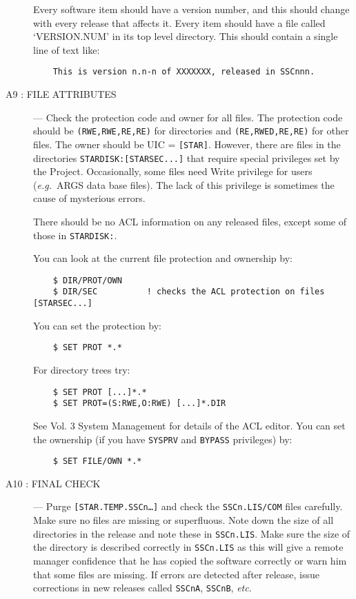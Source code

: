 \begin{description}
Every software item should have a version number, and this should change with
every release that affects it.
Every item should have a file called `VERSION.NUM' in its top level directory.
This should contain a single line of text like:
\begin{verbatim}
    This is version n.n-n of XXXXXXX, released in SSCnnn.
\end{verbatim}

\item [A9 : FILE ATTRIBUTES] ---
Check the protection code and owner for all files.
The protection code should be {\tt (RWE,RWE,RE,RE)} for directories and
{\tt (RE,RWED,RE,RE)} for other files.
The owner should be UIC = {\tt [STAR]}.
However, there are files in the directories {\tt STARDISK:[STARSEC...]} that
require special privileges set by the Project.
Occasionally, some files need Write privilege for users ({\em e.g.}\ ARGS
data base files).
The lack of this privilege is sometimes the cause of mysterious errors.

There should be no ACL information on any released files, except some of those
in {\tt STARDISK:\-[STARSEC...]}.

You can look at the current file protection and ownership by:
\begin{verbatim}
    $ DIR/PROT/OWN
    $ DIR/SEC          ! checks the ACL protection on files [STARSEC...]
\end{verbatim}
You can set the protection by:
\begin{verbatim}
    $ SET PROT *.*
\end{verbatim}
For directory trees try:
\begin{verbatim}
    $ SET PROT [...]*.*
    $ SET PROT=(S:RWE,O:RWE) [...]*.DIR
\end{verbatim}
See Vol. 3 System Management for details of the ACL editor.
You can set the ownership (if you have {\tt SYSPRV} and {\tt BYPASS}
privileges) by:
\begin{verbatim}
    $ SET FILE/OWN *.*
\end{verbatim}

\item [A10 : FINAL CHECK] ---
Purge {\tt [STAR.TEMP.SSCn\ldots]} and check the {\tt SSCn.LIS/COM} files
carefully. Make sure no files are missing or superfluous.
Note down the size of all directories in the release and note these in
{\tt SSCn.LIS}.
Make sure the size of the directory is described correctly in {\tt SSCn.LIS}
as this will give a remote manager confidence that he has copied the software
correctly or warn him that some files are missing.
If errors are detected after release, issue corrections in new releases called
{\tt SSCnA}, {\tt SSCnB}, {\em etc}.
\end{description}

